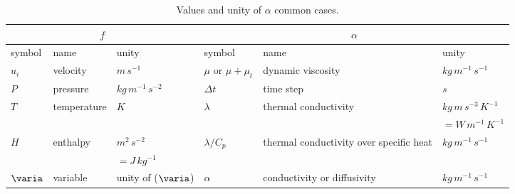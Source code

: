 \begin{table}
{\scriptsize
\begin{center}
\begin{tabular}{||l|l|l||l|l|l||}
\hline
\multicolumn{3}{||c||}{$f$}&\multicolumn{3}{|c||}{$\alpha$}\\
\hline
symbol                            & name                              & unity                    &
symbol                            & name                              & unity                  \\
\hline
$u_i$                               & velocity                          & $m\,s^{-1}$                &
$\mu$ or $\mu+\mu_t$ & dynamic viscosity          & $kg\,m^{-1}\,s^{-1}$     \\
$P$                                  & pressure                         & $kg\,m^{-1}\,s^{-2}$       &
$\Delta t$                       & time step                        & $s$                      \\
$T$                                 & temperature                    & $K$                        &
$\lambda$                      & thermal conductivity      & $kg\,m\,s^{-3}\,K^{-1}$ \\
                                       &                                        &                            &
                                       &                                        & $=W\,m^{-1}\,K^{-1}$\\
$H$                                & enthalpy                          & $m^{2}\,s^{-2}$&
$\lambda/C_p$             & thermal conductivity over specific heat  & $kg\,m^{-1}\,s^{-1}$     \\
                                      &                                                                & $=J\,kg^{-1}$&
                                      &                                         &                          \\
$\varia$                         & variable                            & unity of ($\varia$)               &
$\alpha$                        & conductivity or diffusivity                   & $kg\,m^{-1}\,s^{-1}$     \\
\hline
\end{tabular}
\end{center}
}
\caption{Values and unity of $\alpha$ common cases.}\label{Base_Condli_table_alpha_condli}
\end{table}

